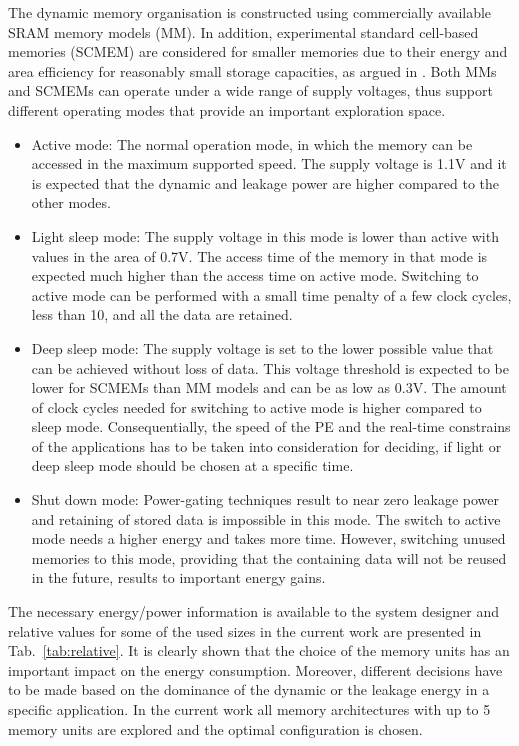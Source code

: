 \documentclass{acm_proc_article-sp}
\begin{document}
The dynamic memory organisation is constructed using commercially available SRAM memory models (MM). In addition, experimental standard cell-based memories (SCMEM) \cite{Mei11}  are  considered for smaller memories due to their energy and area efficiency for reasonably small storage capacities, as argued in \cite{Mei10}. Both MMs and SCMEMs can operate under a wide range of supply voltages, thus support different operating modes that provide an important exploration space.

\begin{itemize}
\item Active mode: The normal operation mode, in which the memory can be accessed in the maximum supported speed. The supply voltage is 1.1V and it is expected that the dynamic and leakage power are higher compared to the other modes.
\item Light sleep mode: The supply voltage in this mode is lower than active with values in the area of 0.7V. The access time of the memory in that mode is expected much higher than the access time on active mode. Switching to active mode can be performed with a small time penalty of a few clock cycles, less than 10, and all the data are retained.  
\item Deep sleep mode: The supply voltage is set to the lower possible value that can be achieved without loss of data. This voltage threshold is expected to be lower for SCMEMs than MM models and can be as low as 0.3V. The amount of clock cycles needed for switching to active mode is higher compared to sleep mode. Consequentially, the speed of the PE and the real-time constrains of the applications has to be taken into consideration for deciding, if light or deep sleep mode should be chosen at a specific time.  
\item Shut down mode: Power-gating techniques result to near zero leakage power and retaining of stored data is impossible in this mode. The switch to active mode needs a higher energy and takes more time. However, switching unused memories to this mode, providing that the containing data will not be reused in the future, results to important energy gains.
\end{itemize}  

The necessary energy/power information is available to the system designer and relative values for some of the used sizes in the current work are presented in Tab.~\ref{tab:relative}. It is clearly shown that the choice of the memory units has an important impact on the energy consumption. Moreover, different decisions have to be made based on the dominance of the dynamic or the leakage energy in a specific application. In the current work all memory architectures with up to 5 memory units are explored and the optimal configuration is chosen.
\end{document}
